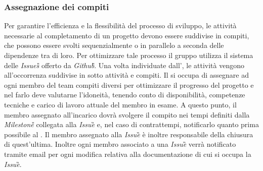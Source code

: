 	\subsubsection{Assegnazione dei compiti}
	Per garantire l'efficienza e la flessibilità del processo di sviluppo, le attività necessarie al completamento di un progetto devono essere suddivise in compiti, che possono essere svolti sequenzialmente o in parallelo a seconda delle dipendenze tra di loro. Per ottimizzare tale processo il gruppo utilizza il sistema delle \emph{Issues\G{}} offerto da \emph{Github\G}.	
	Una volta individuate dall'\Ana{}, le attività vengono all'occorrenza suddivise in sotto attività e compiti. Il \RdP{} si occupa di assegnare ad ogni membro del team compiti diversi per ottimizzare il progresso del progetto e nel farlo deve valutarne l'idoneità, tenendo conto di disponibilità, competenze tecniche e carico di lavoro attuale del membro in esame. A questo punto, il membro assegnato all'incarico dovrà svolgere il compito nei tempi definiti dalla \emph{Milestone\G{}} collegata alla \emph{Issue}\G{} e, nel caso di contrattempi, notificarlo quanto prima possibile al \RdP{}. Il membro assegnato alla \emph{Issue}\G{} è inoltre responsabile della chiusura di quest'ultima. Inoltre ogni membro associato a una \emph{Issue}\G{} verrà notificato tramite email per ogni modifica relativa alla documentazione %
	di cui si occupa la \emph{Issue}\G{}.
